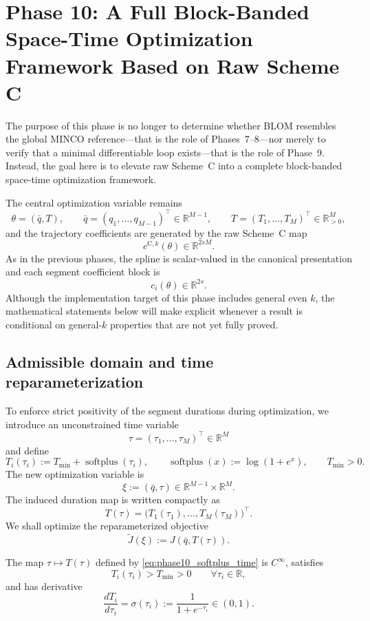 \section{Phase 10: A Full Block-Banded Space-Time Optimization Framework Based on Raw Scheme C}
\label{sec:phase10_full_framework}

The purpose of this phase is no longer to determine whether BLOM resembles the global MINCO reference---that is the role of Phases~7--8---nor merely to verify that a minimal differentiable loop exists---that is the role of Phase~9.
Instead, the goal here is to elevate raw Scheme~C into a complete block-banded space-time optimization framework.

The central optimization variable remains
\[
\theta=(\bar q,T),
\qquad
\bar q=(q_1,\dots,q_{M-1})^\top\in\mathbb R^{M-1},
\qquad
T=(T_1,\dots,T_M)^\top\in\mathbb R_{>0}^{M},
\]
and the trajectory coefficients are generated by the raw Scheme~C map
\[
c^{\mathrm{C},k}(\theta)\in\mathbb R^{2sM}.
\]
As in the previous phases, the spline is scalar-valued in the canonical presentation and each segment coefficient block is
\[
c_i(\theta)\in\mathbb R^{2s}.
\]
Although the implementation target of this phase includes general even \(k\), the mathematical statements below will make explicit whenever a result is conditional on general-\(k\) properties that are not yet fully proved.

\subsection{Admissible domain and time reparameterization}
\label{subsec:phase10_time_reparam}

To enforce strict positivity of the segment durations during optimization, we introduce an unconstrained time variable
\[
\tau=(\tau_1,\dots,\tau_M)^\top\in\mathbb R^M
\]
and define
\begin{equation}
\label{eq:phase10_softplus_time}
T_i(\tau_i):=T_{\min}+\operatorname{softplus}(\tau_i),
\qquad
\operatorname{softplus}(x):=\log(1+e^x),
\qquad
T_{\min}>0.
\end{equation}
The new optimization variable is
\[
\xi:=(\bar q,\tau)\in\mathbb R^{M-1}\times\mathbb R^M.
\]
The induced duration map is written compactly as
\[
T(\tau)=\bigl(T_1(\tau_1),\dots,T_M(\tau_M)\bigr)^\top.
\]
We shall optimize the reparameterized objective
\[
\widetilde J(\xi):=J(\bar q,T(\tau)).
\]

\begin{proposition}
\label{prop:phase10_softplus}
The map \(\tau\mapsto T(\tau)\) defined by \eqref{eq:phase10_softplus_time} is \(C^\infty\), satisfies
\[
T_i(\tau_i)>T_{\min}>0
\qquad
\forall \tau_i\in\mathbb R,
\]
and has derivative
\begin{equation}
\label{eq:phase10_softplus_derivative}
\frac{dT_i}{d\tau_i}
=
\sigma(\tau_i)
:=
\frac{1}{1+e^{-\tau_i}}
\in(0,1).
\end{equation}
\end{proposition}

